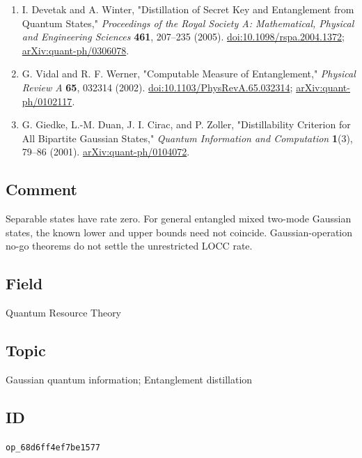 \begin{enumerate}[label={},leftmargin=4.8em,labelsep=0.5em]
  \footnotesize
  \item[\textup{[DW05]}]\label{ref:ser13-1}
  I. Devetak and A. Winter, "Distillation of Secret Key and Entanglement from Quantum States," \emph{Proceedings of the Royal Society A: Mathematical, Physical and Engineering Sciences} \textbf{461}, 207--235 (2005). \href{https://doi.org/10.1098/rspa.2004.1372}{doi:10.1098/rspa.2004.1372}; \href{https://arxiv.org/abs/quant-ph/0306078}{arXiv:quant-ph/0306078}.

  \item[\textup{[VW02]}]\label{ref:ser13-2}
  G. Vidal and R. F. Werner, "Computable Measure of Entanglement," \emph{Physical Review A} \textbf{65}, 032314 (2002). \href{https://doi.org/10.1103/PhysRevA.65.032314}{doi:10.1103/PhysRevA.65.032314}; \href{https://arxiv.org/abs/quant-ph/0102117}{arXiv:quant-ph/0102117}.

  \item[\textup{[GDCZ01]}]\label{ref:ser13-3}
  G. Giedke, L.-M. Duan, J. I. Cirac, and P. Zoller, "Distillability Criterion for All Bipartite Gaussian States," \emph{Quantum Information and Computation} \textbf{1}(3), 79--86 (2001). \href{https://arxiv.org/abs/quant-ph/0104072}{arXiv:quant-ph/0104072}.
\end{enumerate}

\subsection*{Comment}

Separable states have rate zero. For general entangled mixed two-mode Gaussian states, the known lower and upper bounds need not coincide. Gaussian-operation no-go theorems do not settle the unrestricted LOCC rate.

\subsection*{Field}

Quantum Resource Theory

\subsection*{Topic}

Gaussian quantum information; Entanglement distillation

\subsection*{ID}

\texttt{op\_68d6ff4ef7be1577}
